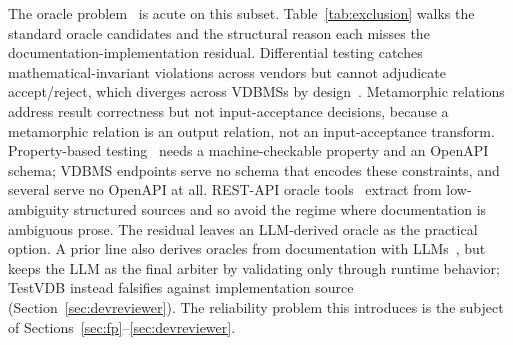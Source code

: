\documentclass[sigconf]{acmart}
\begin{document}
The oracle problem~\cite{barr15} is acute on this subset. Table~\ref{tab:exclusion} walks the standard oracle candidates and the structural reason each misses the documentation-implementation residual. Differential testing catches mathematical-invariant violations across vendors but cannot adjudicate accept/reject, which diverges across VDBMSs by design~\cite{roadmap25}. Metamorphic relations~\cite{metmap24} address result correctness but not input-acceptance decisions, because a metamorphic relation is an output relation, not an input-acceptance transform. Property-based testing~\cite{claessen00} needs a machine-checkable property and an OpenAPI schema; VDBMS endpoints serve no schema that encodes these constraints, and several serve no OpenAPI at all. REST-API oracle tools~\cite{agoraplus25,satori25,mastor26} extract from low-ambiguity structured sources and so avoid the regime where documentation is ambiguous prose. The residual leaves an LLM-derived oracle as the practical option. A prior line also derives oracles from documentation with LLMs~\cite{toradocu16,augmentest25}, but keeps the LLM as the final arbiter by validating only through runtime behavior; TestVDB instead falsifies against implementation source (Section~\ref{sec:devreviewer}). The reliability problem this introduces is the subject of Sections~\ref{sec:fp}--\ref{sec:devreviewer}.
\end{document}

